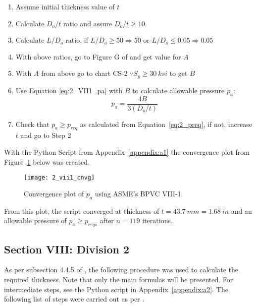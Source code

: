 \begin{enumerate}
	\item Assume initial thickness value of $t$
	\item Calculate $D_o/t$ ratio and assure $D_o/t \geq 10$.
	\item Calculate $L/D_o$ ratio, if $L/D_o \geq 50 \Rightarrow 50$ or  $L/D_o \leq 0.05 \Rightarrow 0.05$
	\item With above ratios, go to Figure G of \cite{ASMEbvpcIID} and get value for $A$
	\item With $A$ from above go to chart CS-2 $\because S_y \geq 30 \ ksi$ to get $B$
	\item Use Equation \ref{eq:2_VII1_pa} with $B$ to calculate allowable pressure $p_a$:
		\begin{equation}
			\label{eq:2_VII1_pa}
			p_a = \frac{4B}{3 \left(D_o/t\right)}
		\end{equation}
	\item Check that $p_a \geq p_{req}$ as calculated from Equation~\ref{eq:2_preq}, if not, increase $t$ and go to Step 2\\
	
\end{enumerate}

With the Python Script from Appendix~\ref{appendix:a1} the convergence plot from Figure~\ref{fig:2_vii1_cnvg} below was created.
\begin{figure}[H]
    \centering
    \texttt{[image: 2\_vii1\_cnvg]}
    \caption{Convergence plot of $p_a$ using ASME's BPVC VIII-1.}
    \label{fig:2_vii1_cnvg}
\end{figure}

From this plot, the script converged at thickness of $t = 43.7\ mm = 1.68\ in$ and an allowable pressure of $p_a\geq p_{reqs}$ after $n=119$ iterations. 


\subsection{Section VIII: Division 2}
As per subsection 4.4.5 of \cite{ASMEbvpcVII2}, the following procedure was used to calculate the required thickness. Note that only the main formulas will be presented. For intermediate steps, see  the Python script in Appendix~\ref{appendix:a2}. The following list of steps were carried out as per \cite{ASMEbvpcVII2}.

